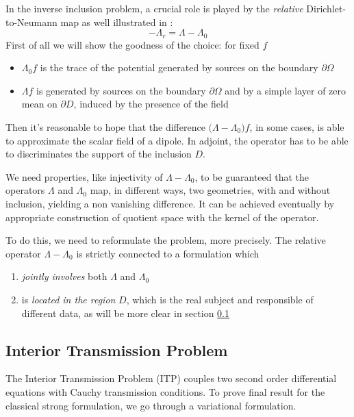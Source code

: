 \documentclass[10pt, a4paper, twoside, openright]{book}
\theoremstyle{definition}
\theoremstyle{plain}
\theoremstyle{plain}
\theoremstyle{plain}
\theoremstyle{plain}
\theoremstyle{plain}
\theoremstyle{plain}
\theoremstyle{plain}
\theoremstyle{plain}
\begin{document}
\par
In the inverse inclusion problem, a crucial role is played by the \textit{relative} Dirichlet-to-Neumann map as well illustrated in \cite{somersalo:preprint}:
\begin{equation}
 -\Lambda_r = \Lambda - \Lambda_0
\end{equation}
First of all we will show the goodness of the choice: for fixed $f$
\begin{itemize}
 \item $\Lambda_0 f$ is the trace of the potential generated by sources on the boundary $\partial \Omega$ 
 \item $\Lambda f$ is generated by sources on the boundary $\partial \Omega$ and by a simple layer of zero mean on $\partial D$, induced by the presence of the field
\end{itemize}
Then it's reasonable to hope that the difference $\bigl(\Lambda-\Lambda_0\bigr)f$, in some cases, is able to approximate the scalar field of a dipole.
In adjoint, the operator has to be able to discriminates the support of the inclusion $D$.
\par
We need properties, like injectivity of $\Lambda - \Lambda_0$, to be guaranteed that the operators $\Lambda$ and $\Lambda_0$ map, in different ways, two geometries, with and without inclusion, yielding a non vanishing difference.
It can be achieved eventually by appropriate construction of quotient space with the kernel of the operator.
\par
To do this, we need to reformulate the problem, more precisely.
The relative operator $\Lambda - \Lambda_0$ is strictly connected to a formulation which
\begin{enumerate}
 \item \emph{jointly involves} both $\Lambda$ and $\Lambda_0$
 \item is \emph{located in the region} $D$, which is the real subject and responsible of different data, as will be more clear in section \ref{}
\end{enumerate}

\subsection{Interior Transmission Problem}
The Interior Transmission Problem (ITP) couples two second order differential equations with Cauchy transmission conditions.
To prove final result for the classical strong formulation, we go through a variational formulation.
\end{document}
